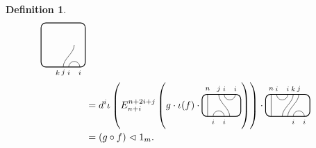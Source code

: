 \documentclass[11pt]{article}
\theoremstyle{plain}
\theoremstyle{definition}
\newtheorem{defn}[thm]{Definition}
\begin{document}
\begin{defn}
\begin{align*}
\begin{tikzpicture}[baseline=.3cm]
\begin{scope}[shift={(0,-.4)}]
    \node at (.6,-.2) {\scriptsize{$k$}};
    \draw (.8,0) .. controls ++(90:.3cm) and ++(270:.3cm) .. (1.2,.8);
    \node at (.8,-.2) {\scriptsize{$j$}};
    \draw (1,0) arc (180:0:.2cm);
    \node at (1,-.2) {\scriptsize{$i$}};
    \node at (1.4,-.2) {\scriptsize{$i$}};
   \end{scope}
   \draw[thick, rounded corners=5pt] (0,-.4) rectangle (1.6,1.2);
  \end{tikzpicture}
  \\&= 
  d^i
  \iota\left(E^{n+2i+j}_{n+i}\left(g\cdot\iota(f)\cdot
  \begin{tikzpicture}[baseline=.3cm]
   \draw (.2,0) -- (.2,.8);
   \node at (.2,1) {\scriptsize{$n$}};
   \draw (.6,.8) .. controls ++(-90:.3cm) and ++ (-270:.3cm) .. (1,0);
   \node at (.6,1) {\scriptsize{$j$}};
   \draw (.8,.8) arc (-180:0:.2cm);
   \node at (.8,1) {\scriptsize{$i$}};
   \node at (1.2,1) {\scriptsize{$i$}};
   \draw (.4,0) arc (180:0:.2cm);
   \node at (.4,-.2) {\scriptsize{$i$}};
   \node at (.8,-.2) {\scriptsize{$i$}};
   \draw[thick, rounded corners=5pt] (0,0) rectangle (1.4,.8);
  \end{tikzpicture}
  \right)\right)\cdot
  \begin{tikzpicture}[baseline=.3cm]
   \draw (.2,0) -- (.2,.8);
   \node at (.2,1) {\scriptsize{$n$}};
   \draw (.4,.8) arc (-180:0:.2cm);
   \node at (.4,1) {\scriptsize{$i$}};
   \node at (.8,1) {\scriptsize{$i$}};
   \draw (.6,0) .. controls ++(90:.3cm) and ++(270:.3cm) .. (1,.8);
   \node at (1,1) {\scriptsize{$k$}};
   \draw (.8,0) .. controls ++(90:.3cm) and ++(270:.3cm) .. (1.2,.8);
   \node at (1.2,1) {\scriptsize{$j$}};
   \draw (1,0) arc (180:0:.2cm);
   \node at (1,-.2) {\scriptsize{$i$}};
   \node at (1.4,-.2) {\scriptsize{$i$}};
   \draw[thick, rounded corners=5pt] (0,0) rectangle (1.6,.8);
  \end{tikzpicture}
  \\&= (g\circ f)\vartriangleleft1_m.
 \end{align*}


\end{defn}
\end{document}
